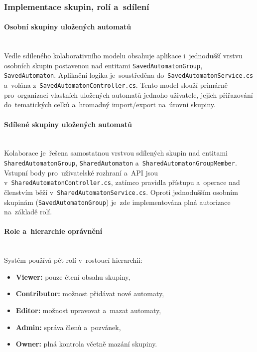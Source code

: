 \documentclass[
  master,
  program=ainfvs,
  printversion,
  figures=false,
  tables=false,
  glossaries,
  index
]{kidiplom}
\begin{document}
\subsubsection{Implementace skupin, rolí a~sdílení}

\paragraph{Osobní skupiny uložených automatů} \mbox{} \\
Vedle sdíleného kolaborativního modelu obsahuje aplikace i~jednodušší vrstvu osobních skupin postavenou nad entitami \texttt{Saved\-Automaton\-Group}, \texttt{Saved\-Automaton}. Aplikační logika je~soustředěna do~\texttt{Saved\-Automaton\-Ser\-vi\-ce\-.\-cs} a~volána z~\texttt{Saved\-Automaton\-Controller.cs}. Tento model slouží primárně pro~organizaci vlastních uložených automatů jednoho uživatele, jejich přiřazování do~tematických celků a~hromadný import/export na~úrovni skupiny.

\paragraph{Sdílené skupiny uložených automatů} \mbox{} \\

Kolaborace je~řešena samostatnou vrstvou sdílených skupin nad entitami \texttt{Shared\-Automaton\-Group}, \texttt{Shared\-Automaton} a~\texttt{Shared\-Automaton\-Gro\-up\-Member}. Vstupní body pro~uživatelské rozhraní a~API jsou v~\texttt{Shared\-Au\-to\-ma\-ton\-Con\-tro\-ller.cs}, zatímco pravidla přístupu a~operace nad členstvím běží v~\texttt{Sha\-red\-Au\-to\-ma\-ton\-Service.cs}. Oproti jednodušším osobním skupinám (\texttt{Sa\-ved\-Au\-to\-ma\-ton\-Group}) je~zde implementována plná autorizace na~základě rolí.

\paragraph{Role a~hierarchie oprávnění} \mbox{} \\
Systém používá pět rolí v~rostoucí hierarchii:

\begin{itemize}
    \item \textbf{Viewer:} pouze čtení obsahu skupiny,
    \item \textbf{Contributor:} možnost přidávat nové automaty,
    \item \textbf{Editor:} možnost upravovat a~mazat automaty,
    \item \textbf{Admin:} správa členů a~pozvánek,
    \item \textbf{Owner:} plná kontrola včetně mazání skupiny.
\end{itemize}
\end{document}
